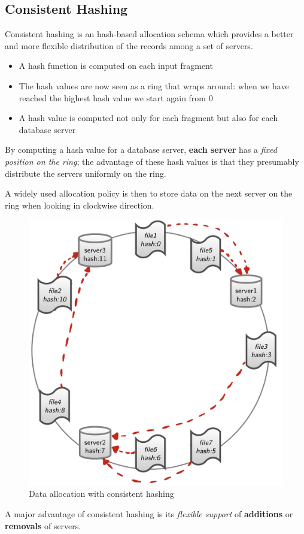 \subsection{Consistent Hashing}
Consistent hashing is an hash-based allocation schema which provides a better and more flexible distribution of the records among a set of servers.
\begin{itemize}
    \item A hash function is computed on each input fragment
    \item The hash values are now seen as a ring that wraps around: when we have reached the highest hash value we start again from 0
    \item A hash value is computed not only for each fragment but also for each database server
\end{itemize}
By computing a hash value for a database server, \textbf{each server} has a \textit{fixed position on the ring}; the advantage of these hash values is that they presumably distribute the servers uniformly on the ring.
\newpage
\begin{tcolorbox}
A widely used allocation policy is then to store data on the next server on the ring when looking in clockwise direction.
\end{tcolorbox}
\begin{figure}[!h]
        \centering
        \includegraphics[width=0.4\linewidth]{images/AdvancedDataManagment/data_fragmentation/data_allocation.jpeg}
        \caption{Data allocation with consistent hashing}
    \end{figure}
A major advantage of consistent hashing is its \textit{flexible support} of \textbf{additions} or \textbf{removals} of servers.

